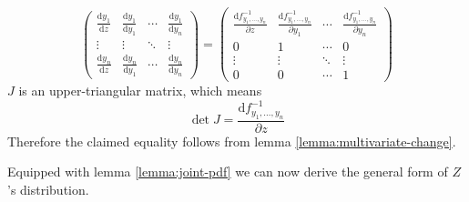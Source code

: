 \documentclass[11pt,a4paper]{book}
\begin{document}
\begin{proof2}
\begin{equation*}
\begin{pmatrix}
      \frac{\mathrm{d} y_{1}}{\mathrm{d} z} & \frac{\mathrm{d} y_{1}}{\mathrm{d} y_{1}} & \cdots & \frac{\mathrm{d} y_{1}}{\mathrm{d} y_{n}}\\
      \vdots & \vdots & \ddots & \vdots\\
      \frac{\mathrm{d} y_{n}}{\mathrm{d} z} & \frac{\mathrm{d} y_{n}}{\mathrm{d} y_{1}} & \cdots & \frac{\mathrm{d} y_{n}}{\mathrm{d} y_{n}}
    \end{pmatrix}
    =
    \begin{pmatrix}
      \frac{\mathrm{d}f_{y_{1}, \dots, y_{n}}^{-1}}{\partial z} & \frac{\mathrm{d}f_{y_{1}, \dots, y_{n}}^{-1}}{\partial y_{1}} & \cdots & \frac{\mathrm{d}f_{y_{1}, \dots, y_{n}}^{-1}}{\partial y_{n}}\\
      0 & 1 & \cdots & 0\\
      \vdots & \vdots & \ddots & \vdots\\
      0 & 0 & \cdots & 1
    \end{pmatrix}
  \end{equation*}
  $J$ is an upper-triangular matrix, which means
  \begin{equation*}
    \det J = \frac{\mathrm{d}f_{y_{1}, \dots, y_{n}}^{-1}}{\partial z}
  \end{equation*}
  Therefore the claimed equality follows from lemma \ref{lemma:multivariate-change}.
\end{proof2}

Equipped with lemma \ref{lemma:joint-pdf} we can now derive the general form of
$Z$'s distribution.
\end{document}
